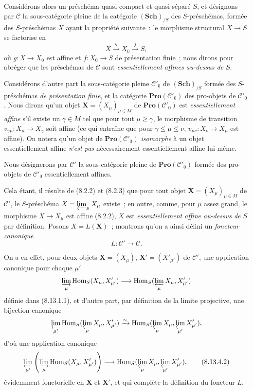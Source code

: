 \begin{env}[8.13.4]
\label{IV.8.13.4-fr}
Considérons alors un préschéma quasi-compact et quasi-séparé $S$, et désignons
par $\mathcal C$ la sous-catégorie pleine de la catégorie
$(\mathbf{Sch})_{/S}$ des $S$-préschémas, formée des $S$-préschémas $X$ ayant
la propriété suivante~: le morphisme structural $X\to S$ se factorise en
\[
X\xrightarrow{g}X_0\xrightarrow{f}S,
\]
où $g:X\to X_0$ est affine et $f:X_0\to S$ de présentation finie~; nous
dirons pour abréger que les préschémas de $\mathcal C$ sont
\emph{essentiellement affines au-dessus de $S$}.

Considérons d'autre part la sous-catégorie pleine $\mathcal C'_0$ de
$(\mathbf{Sch})_{/S}$ formée des $S$-préschémas \emph{de présentation finie},
et la catégorie $\mathbf{Pro}(\mathcal C'_0)$ des pro-objets de
$\mathcal C'_0$. Nous dirons qu'un objet
$\mathbf X=(X_\mu)_{\mu\in M}$ de $\mathbf{Pro}(\mathcal C'_0)$ est
\emph{essentiellement affine} s'il existe un $\gamma\in M$ tel que pour tout
$\mu\geqslant\gamma$, le morphisme de transition
$v_{\gamma\mu}:X_\mu\to X_\gamma$ soit affine (ce qui entraîne que pour
$\gamma\leqslant\mu\leqslant\nu$, $v_{\mu\nu}:X_\nu\to X_\mu$ est affine).
On notera qu'un objet de $\mathbf{Pro}(\mathcal C'_0)$ \emph{isomorphe} à un
objet essentiellement affine \emph{n'est pas} nécessairement essentiellement
affine lui-même.

Nous désignerons par $\mathcal C'$ la sous-catégorie pleine de
$\mathbf{Pro}(\mathcal C'_0)$ formée des pro-objets de $\mathcal C'_0$
essentiellement affines.

Cela étant, il résulte de (8.2.2) et (8.2.3) que pour tout objet
$\mathbf X=(X_\mu)_{\mu\in M}$ de $\mathcal C'$, le $S$-préschéma
$X=\varprojlim_\mu X_\mu$ existe~; en outre, comme, pour $\mu$ assez grand,
le morphisme $X\to X_\mu$ est affine (8.2.2), $X$ est
\emph{essentiellement affine au-dessus de $S$} par définition. Posons
$X=L(\mathbf X)$~; montrons qu'on a ainsi défini un \emph{foncteur canonique}
\begin{equation}
\label{IV.8.13.4.1-fr}
L:\mathcal C'\longrightarrow\mathcal C. \tag{8.13.4.1}
\end{equation}

On a en effet, pour deux objets $\mathbf X=(X_\mu)$,
$\mathbf X'=(X'_{\mu'})$ de $\mathcal C'$, une application canonique pour
chaque $\mu'$
\[
\varinjlim_\mu\operatorname{Hom}_S(X_\mu,X'_{\mu'})
\longrightarrow
\operatorname{Hom}_S(\varprojlim_\mu X_\mu,X'_{\mu'})
\]
définie dans (8.13.1.1), et d'autre part, par définition de la limite
projective, une bijection canonique
\[
\varprojlim_{\mu'}
\operatorname{Hom}_S(\varprojlim_\mu X_\mu,X'_{\mu'})
\xrightarrow{\sim}
\operatorname{Hom}_S(\varprojlim_\mu X_\mu,
\varprojlim_{\mu'}X'_{\mu'}),
\]
d'où une application canonique
\begin{equation}
\label{IV.8.13.4.2-fr}
\varprojlim_{\mu'}\left(\varinjlim_\mu
\operatorname{Hom}_S(X_\mu,X'_{\mu'})\right)
\longrightarrow
\operatorname{Hom}_S(\varprojlim_\mu X_\mu,
\varprojlim_{\mu'}X'_{\mu'}), \tag{8.13.4.2}
\end{equation}
évidemment fonctorielle en $\mathbf X$ et $\mathbf X'$, et qui complète la
définition du foncteur $L$.
\end{env}

